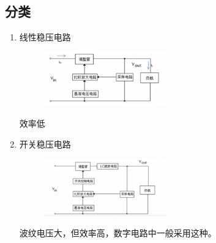 \documentclass[11pt]{article}
\begin{document}
\subsection{分类}
\begin{enumerate}[$\bullet$]
    \item 线性稳压电路
    \begin{figure}[H] %
        \centering %
        \includegraphics[width=0.5\textwidth]{10.PNG} %
    \end{figure}
    效率低
    \item 开关稳压电路
    \begin{figure}[H] %
        \centering %
        \includegraphics[width=0.5\textwidth]{11.PNG} %
    \end{figure}
    波纹电压大，但效率高，数字电路中一般采用这种。
\end{enumerate}
\end{document}
